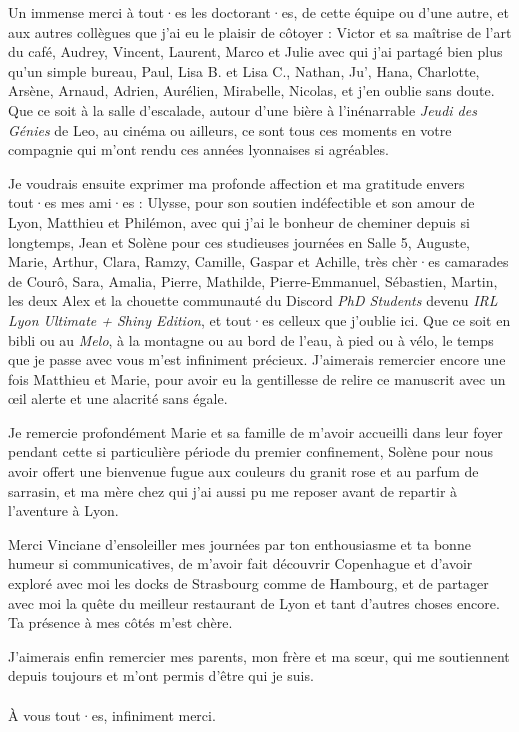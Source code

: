 Un immense merci à tout·es les doctorant·es, de cette équipe ou d'une autre, et aux autres collègues que j'ai eu le plaisir de côtoyer : Victor et sa maîtrise de l'art du café, Audrey, Vincent, Laurent, Marco et Julie avec qui j'ai partagé bien plus qu'un simple bureau, Paul, Lisa B. et Lisa C., Nathan, Ju', Hana, Charlotte, Arsène, Arnaud, Adrien, Aurélien, Mirabelle, Nicolas, et j'en oublie sans doute.
Que ce soit à la salle d'escalade, autour d'une bière à l'inénarrable \emph{Jeudi des Génies} de Leo, au cinéma ou ailleurs, ce sont tous ces moments en votre compagnie qui m'ont rendu ces années lyonnaises si agréables.

Je voudrais ensuite exprimer ma profonde affection et ma gratitude envers tout·es mes ami·es : Ulysse, pour son soutien indéfectible et son amour de Lyon, Matthieu et Philémon, avec qui j'ai le bonheur de cheminer depuis si longtemps, Jean et Solène pour ces studieuses journées en Salle 5, Auguste, Marie, Arthur, Clara, Ramzy, Camille, Gaspar et Achille, très chèr·es camarades de Courô, Sara, Amalia, Pierre, Mathilde, Pierre-Emmanuel, Sébastien, Martin, les deux Alex et la chouette communauté du Discord \emph{PhD Students} devenu \emph{IRL Lyon Ultimate + Shiny Edition}, et tout·es celleux que j'oublie ici.
Que ce soit en bibli ou au \emph{Melo}, à la montagne ou au bord de l'eau, à pied ou à vélo, le temps que je passe avec vous m'est infiniment précieux.
J'aimerais remercier encore une fois Matthieu et Marie, pour avoir eu la gentillesse de relire ce manuscrit avec un œil alerte et une alacrité sans égale.

Je remercie profondément Marie et sa famille de m'avoir accueilli dans leur foyer pendant cette si particulière période du premier confinement, Solène pour nous avoir offert une bienvenue fugue aux couleurs du granit rose et au parfum de sarrasin, et ma mère chez qui j'ai aussi pu me reposer avant de repartir à l'aventure à Lyon.

Merci Vinciane d'ensoleiller mes journées par ton enthousiasme et ta bonne humeur si communicatives, de m'avoir fait découvrir Copenhague et d'avoir exploré avec moi les docks de Strasbourg comme de Hambourg, et de partager avec moi la quête du meilleur restaurant de Lyon et tant d'autres choses encore.
Ta présence à mes côtés m'est chère.

J'aimerais enfin remercier mes parents, mon frère et ma sœur, qui me soutiennent depuis toujours et m'ont permis d'être qui je suis.

\paragraph{}À vous tout·es, infiniment merci.

